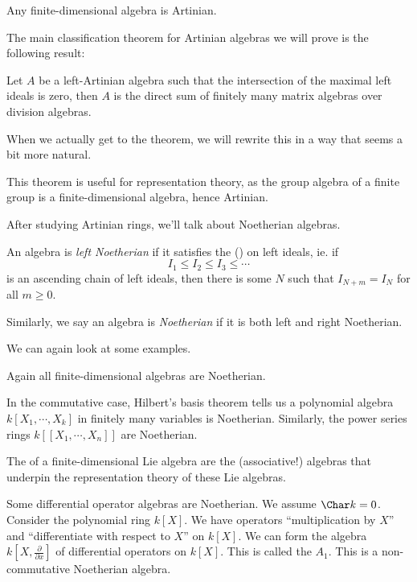 \documentclass[a4paper]{article}
\begin{document}
\begin{eg}
  Any finite-dimensional algebra is Artinian.
\end{eg}

The main classification theorem for Artinian algebras we will prove is the following result:
\begin{thm}
  Let $A$ be a left-Artinian algebra such that the intersection of the maximal left ideals is zero, then $A$ is the direct sum of finitely many matrix algebras over division algebras.
\end{thm}
When we actually get to the theorem, we will rewrite this in a way that seems a bit more natural.

This theorem is useful for representation theory, as the group algebra of a finite group is a finite-dimensional algebra, hence Artinian.

After studying Artinian rings, we'll talk about Noetherian algebras.
\begin{defi}
  An algebra is \emph{left Noetherian} if it satisfies the  () on left ideals, ie. if
  \[
    I_1 \leq I_2 \leq I_3 \leq \cdots
  \]
  is an ascending chain of left ideals, then there is some $N$ such that $I_{N + m} = I_N$ for all $m \geq 0$.

  Similarly, we say an algebra is \emph{Noetherian} if it is both left and right Noetherian.
\end{defi}

We can again look at some examples.
\begin{eg}
  Again all finite-dimensional algebras are Noetherian.
\end{eg}

\begin{eg}
  In the commutative case, Hilbert's basis theorem tells us a polynomial algebra $k[X_1, \cdots, X_k]$ in finitely many variables is Noetherian. Similarly, the power series rings $k[[X_1, \cdots, X_n]]$ are Noetherian.
\end{eg}

\begin{eg}
  The  of a finite-dimensional Lie algebra are the (associative!) algebras that underpin the representation theory of these Lie algebras.
\end{eg}

\begin{eg}
  Some differential operator algebras are Noetherian. We assume $\Char k = 0$. Consider the polynomial ring $k[X]$. We have operators ``multiplication by $X$'' and ``differentiate with respect to $X$'' on $k[X]$. We can form the algebra $k[X, \frac{\partial}{\partial x}]$ of differential operators on $k[X]$. This is called the  $A_1$. This is a non-commutative Noetherian algebra.
\end{eg}
\end{document}

